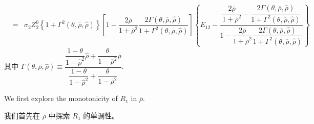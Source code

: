 \documentclass[10.0pt]{article}
\begin{document}
{\begin{eqnarray*}
& = & \sigma_2 Z_2^0 \left\{ 1 + \Gamma^2 (\theta, \overline{\rho}, {\hat \rho}) \right\} \left[ 1 - \dfrac{2 \overline{\rho}}{1 + \overline{\rho}^2} \dfrac{2 \Gamma (\theta, \overline{\rho}, {\hat \rho})}{1 + \Gamma^2 (\theta, \overline{\rho}, {\hat \rho})} 
\right] \left\{ E_{1 2} - \dfrac{\dfrac{2 \overline{\rho}}{1 + \overline{\rho}^2} - \dfrac{2 \Gamma (\theta, \overline{\rho}, {\hat \rho})}{1 + \Gamma^2 (\theta, \overline{\rho}, {\hat \rho})}}{1 - \dfrac{2 \overline{\rho}}{1 + \overline{\rho}^2} \dfrac{2 \Gamma (\theta, \overline{\rho}, {\hat \rho})}{1 + \Gamma^2 (\theta, \overline{\rho}, {\hat \rho})}} \right\}
\end{eqnarray*}}
其中 {\footnotesize $ \Gamma (\theta, \overline{\rho}, {\hat \rho}) \equiv \dfrac{\dfrac{1 - \theta}{1 - {\hat \rho}^2} {\hat \rho} + \dfrac{\theta}{1 - \overline{\rho}^2} \overline{\rho}}{\dfrac{1 - \theta}{1 - {\hat \rho}^2} + \dfrac{\theta}{1 - \overline{\rho}^2}} $}.

We first explore the monotonicity of {\footnotesize $ R_1 $} in {\footnotesize $ \overline{\rho} $}.

我们首先在 {\footnotesize $ \overline{\rho} $} 中探索 {\footnotesize $ R_1 $} 的单调性。
\end{document}
